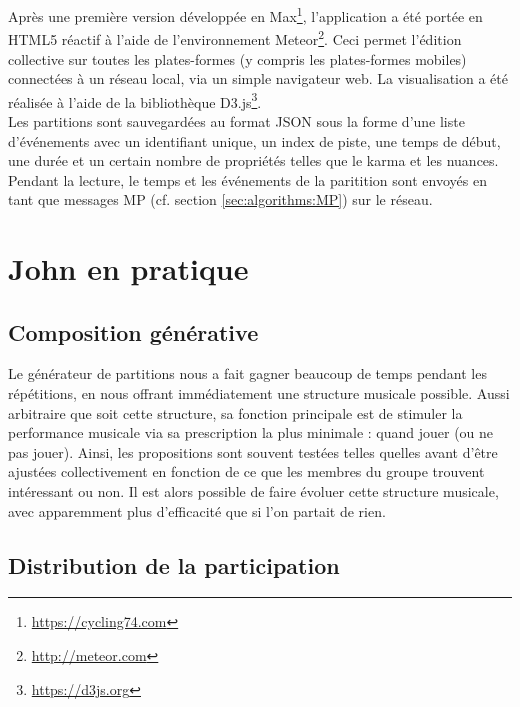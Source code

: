 \noindent Après une première version développée en Max\footnote{\url{https://cycling74.com}}, l'application a été portée en HTML5 réactif à l'aide de l'environnement Meteor\footnote{\url{http://meteor.com}}. Ceci permet l'édition collective sur toutes les plates-formes (y compris les plates-formes mobiles) connectées à un réseau local, via un simple navigateur web. La visualisation a été réalisée à l'aide de la bibliothèque D3.js\footnote{\url{https://d3js.org}}.\\
\indent Les partitions sont sauvegardées au format \gls{JSON} sous la forme d'une liste d'événements avec un identifiant unique, un index de piste, une temps de début, une durée et un certain nombre de propriétés telles que le karma et les nuances. Pendant la lecture, le temps et les événements de la paritition sont envoyés en tant que messages MP (cf. section \ref{sec:algorithms:MP}) sur le réseau.

\section{John en pratique}
\subsection{Composition générative}

\noindent Le générateur de partitions nous a fait gagner beaucoup de temps pendant les répétitions, en nous offrant immédiatement une structure musicale possible. Aussi arbitraire que soit cette structure, sa fonction principale est de stimuler la performance musicale via sa prescription la plus minimale : quand jouer (ou ne pas jouer). Ainsi, les propositions sont souvent testées telles quelles avant d'être ajustées collectivement en fonction de ce que les membres du groupe trouvent intéressant ou non. Il est alors possible de faire évoluer cette structure musicale, avec apparemment plus d'efficacité que si l'on partait de rien.

\subsection{Distribution de la participation}


